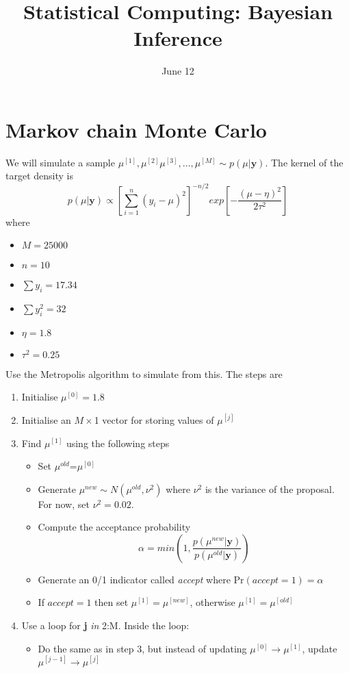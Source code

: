 \documentclass{article}
\begin{document}
\title{Statistical Computing: Bayesian Inference}
\date{June 12}
\maketitle
\section*{Markov chain Monte Carlo}
We will simulate a sample $\mu^{[1]},\mu^{[2]}\mu^{[3]},\ldots,\mu^{[M]}\sim p(\mu|{\bm y})$.  The kernel of the target density is
\begin{equation}
p(\mu|{\bm y})\propto \left[\sum\limits_{i=1}^n (y_i-\mu)^2\right]^{-n/2}
exp\left[-\frac{(\mu-\eta)^2}{2\tau^2}\right]
\end{equation}
where 
\begin{itemize}
\item $M=25000$
\item $n=10$
\item $\sum y_i=17.34$
\item $\sum y^2_i=32$
\item $\eta=1.8$
\item $\tau^2=0.25$
\end{itemize}
Use the Metropolis algorithm to simulate from this.  The steps are
\begin{enumerate}
\item Initialise $\mu^{[0]}=1.8$
\item Initialise an $M\times$1 vector for storing values of $\mu^{[j]}$
\item Find $\mu^{[1]}$ using the following steps
\begin{itemize}
\item Set $\mu^{old}$=$\mu^{[0]}$
\item Generate $\mu^{new}\sim N(\mu^{old},\nu^2)$ where $\nu^2$ is the variance of the proposal.  For now, set $\nu^2=0.02$.
\item Compute the acceptance probability 
\begin{equation}
\alpha=min\left(1,\frac{p(\mu^{new}|{\bm y})}{p(\mu^{old}|{\bm y})}\right)
\end{equation}
\item Generate an 0/1 indicator called {\em accept} where $\mbox{Pr}(accept=1)=\alpha$
\item If $accept=1$ then set $\mu^{[1]}=\mu^{[new]}$, otherwise $\mu^{[1]}=\mu^{[old]}$
\end{itemize} 
\item Use a loop for {\bf j} {\em in} 2:M.  Inside the  loop:
\begin{itemize}
\item Do the same as in step 3, but instead of updating $\mu^{[0]}\rightarrow \mu^{[1]}$, update $\mu^{[j-1]}\rightarrow \mu^{[j]}$
\end{itemize}
\end{enumerate}
\end{document}
